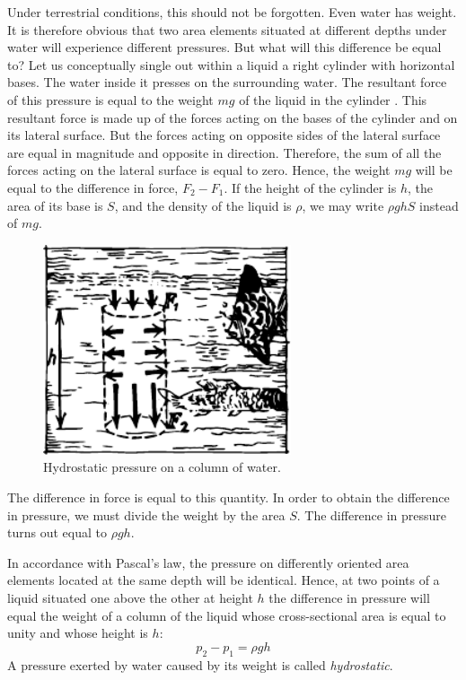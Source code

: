 Under terrestrial conditions, this should not be forgotten. Even water has weight. It is therefore obvious that two area elements situated at different depths under water will experience different pressures. But what will this difference be equal to? Let us conceptually single out within a liquid a right cylinder with horizontal bases. The water inside it presses on the surrounding
water. The resultant force of this pressure is equal to the weight $mg$ of the liquid in the cylinder . This resultant force is made up of the forces acting on the bases of the cylinder and on its lateral surface. But the forces acting on opposite sides of the lateral surface are equal in magnitude and opposite in direction. Therefore, the sum of all the forces acting on the lateral surface
is equal to zero. Hence, the weight $mg$ will be equal to the difference in force, $F_{2} - F_{1}$. If the height of the
cylinder is $h$, the area of its base is $S$, and the density
of the liquid is $\rho$, we may write $\rho g h S$ instead of $mg$.

\begin{figure}[!ht]
\centering
\includegraphics[width=0.65\textwidth]{figures/fig-7-2.pdf}
\caption{Hydrostatic pressure on a column of water.}
\label{fig-7-02}
\end{figure}


The difference in force is equal to this quantity. In order to obtain the difference in pressure, we must divide the
weight by the area $S$. The difference in pressure turns out equal to $\rho gh$.

In accordance with Pascal's law, the pressure on differently oriented area elements located at the same depth will be identical. Hence, at two points of a liquid situated one above the other at height $h$ the difference in pressure will equal the weight of a column of the liquid whose cross-sectional area is equal to unity and whose height is $h$:
\begin{equation*}%
p_{2} - p_{1} = \rho gh
\end{equation*}
A pressure exerted by water caused by its weight is called \emph{hydrostatic}.

